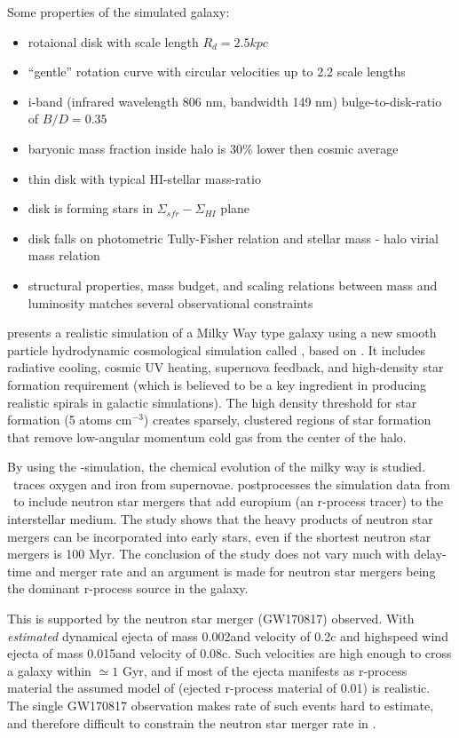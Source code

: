 Some properties of the simulated galaxy:
\begin{itemize}
\item{rotaional disk with scale length $R_d=2.5kpc$}
\item{``gentle'' rotation curve with circular velocities up to 2.2
  scale lengths}
\item{i-band (infrared wavelength 806 nm, bandwidth 149 nm)
  bulge-to-disk-ratio of $B/D=0.35$}
\item{baryonic mass fraction inside halo is 30\% lower then
  cosmic average}
\item{thin disk with typical HI-stellar mass-ratio}
\item{disk is forming stars in $\Sigma_{sfr}-\Sigma_{HI}$ plane}
\item{disk falls on photometric Tully-Fisher relation and
  stellar mass - halo virial mass relation}
\item{structural properties, mass budget, and scaling relations between mass and luminosity matches several observational constraints}
\end{itemize}



 presents a realistic simulation of a Milky Way type galaxy using a new smooth particle hydrodynamic cosmological simulation called \eris, based on \gasoline{}. It includes radiative cooling, cosmic UV heating, supernova feedback, and high-density star formation requirement (which is believed to be a key ingredient in producing realistic spirals in galactic simulations).
The high density threshold for star formation (5 atoms cm$^{-3}$) creates sparsely, clustered regions of star formation that remove low-angular momentum cold gas from the center of the halo. 

By using the \eris-simulation, the chemical evolution of the milky way is studied.
\eris\ traces oxygen and iron from supernovae.
 postprocesses the simulation data from \eris\ to include neutron star mergers that add europium (an r-process tracer) to the interstellar medium.
The study shows that the heavy products of neutron star mergers can be incorporated into early stars, even if the shortest neutron star mergers is 100 Myr. The conclusion of the study does not vary much with delay-time and merger rate and an argument is made for neutron star mergers being the dominant r-process source in the galaxy.

This is supported by the neutron star merger (GW170817) observed. With \textit{estimated} dynamical ejecta of mass 0.002\msol and velocity of 0.2c and highspeed wind ejecta of mass 0.015\msol and velocity of 0.08c. Such velocities are high enough to cross a galaxy within $\simeq 1$ Gyr, and if most of the ejecta manifests as r-process material the assumed model of  (ejected r-process material of 0.01\msol) is realistic. The single GW170817 observation makes rate of such events hard to estimate, and therefore difficult to constrain the neutron star merger rate in \eris.


